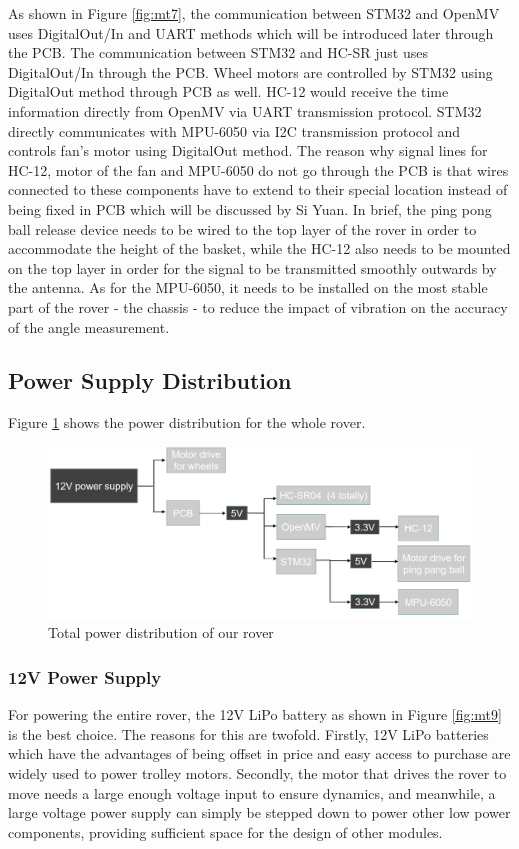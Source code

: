 \documentclass[12pt, a4paper, oneside]{report}
\begin{document}
As shown in Figure \ref{fig:mt7}, the communication between STM32 and OpenMV uses DigitalOut/In and UART methods which will be introduced later through the PCB. The communication between STM32 and HC-SR just uses DigitalOut/In through the PCB. Wheel motors are controlled by STM32 using DigitalOut method through PCB as well. HC-12 would receive the time information directly from OpenMV via UART transmission protocol. STM32 directly communicates with MPU-6050 via I2C transmission protocol and controls fan’s motor using DigitalOut method. The reason why signal lines for HC-12, motor of the fan and MPU-6050 do not go through the PCB is that wires connected to these components have to extend to their special location instead of being fixed in PCB which will be discussed by Si Yuan. In brief, the ping pong ball release device needs to be wired to the top layer of the rover in order to accommodate the height of the basket, while the HC-12 also needs to be mounted on the top layer in order for the signal to be transmitted smoothly outwards by the antenna. As for the MPU-6050, it needs to be installed on the most stable part of the rover - the chassis - to reduce the impact of vibration on the accuracy of the angle measurement.

\newpage
\subsection{Power Supply Distribution}
Figure \ref{fig:mt8} shows the power distribution for the whole rover.

\begin{figure}[H]
  \centering
  \includegraphics[width=1\textwidth]{pic/Motor Drive/18.png}
  \caption{Total power distribution of our rover}
  \label{fig:mt8}
\end{figure}

\subsubsection{12V Power Supply}
For powering the entire rover, the 12V LiPo battery as shown in Figure \ref{fig:mt9} is the best choice. The reasons for this are twofold. Firstly, 12V LiPo batteries which have the advantages of being offset in price and easy access to purchase are widely used to power trolley motors. Secondly, the motor that drives the rover to move needs a large enough voltage input to ensure dynamics, and meanwhile, a large voltage power supply can simply be stepped down to power other low power components, providing sufficient space for the design of other modules.
\end{document}
